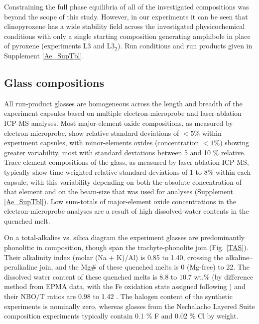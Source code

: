 \documentclass[review,authoryear,12pt]{elsarticle}
\begin{document}
Constraining the full phase equilibria of all of the investigated compositions was beyond the scope of this study. However, in our experiments it can be seen that clinopyroxene has a wide stability field across the investigated physicochemical conditions with only a single starting composition generating amphibole in place of pyroxene (experiments L3 and L$3_2$). Run conditions and run products given in Supplement \ref{Ae_SupTbl}.

\subsection{Glass compositions}

All run-product glasses are homogeneous across the length and breadth of the experiment capsules based on multiple electron-microprobe and laser-ablation ICP-MS analyses. Most major-element oxide compositions, as measured by electron-microprobe, show relative standard deviations of $<5\%$ within experiment capsules, with minor-elements oxides (concentration $<1\%$) showing greater variability, most with standard deviations between 5 and 10 \% relative. Trace-element-compositions of the glass, as measured by laser-ablation ICP-MS, typically show time-weighted relative standard deviations of 1 to 8\% within each capsule, with this variability depending on both the absolute concentration of that element and on the beam-size that was used for analyses (Supplement \ref{Ae_SupTbl}). Low sum-totals of major-element oxide concentrations in the electron-microprobe analyses are a result of high dissolved-water contents in the quenched melt.

On a total-alkalies vs. silica diagram the experiment glasses are predominantly phonolitic in composition, though span the trachyte-phonolite join (Fig. \ref{TAS}). Their alkalinity index (molar (Na + K)/Al) is 0.85 to 1.40, crossing the alkaline--peralkaline join, and the Mg\# of these quenched melts is 0 (Mg-free) to 22. The dissolved water content of these quenched melts is 8.8 to 10.7 wt.\% (by difference method from EPMA data, with the Fe oxidation state assigned following \citealt{Kress1991}) and their NBO/T ratios are 0.98 to 1.42 \citep{Mysen1982,Mysen1985}. The halogen content of the synthetic experiments is nominally zero, whereas glasses from the Nechalacho Layered Suite composition experiments typically contain 0.1 \% F and 0.02 \% Cl by weight.
\end{document}
